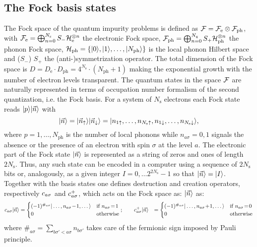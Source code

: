 \documentclass[edipack2.tex]{subfiles}
\begin{document}
\subsection{The Fock basis states}\label{sSecBasis}
The Fock space of the quantum impurity problems is defined as
${\cal F}={\cal F}_\mathrm{e}\otimes {\cal F}_\mathrm{ph}$, with ${\cal F}_\mathrm{e}=\bigoplus_{n=0}^{N_\mathrm{s}}
S_-{\cal H}_\mathrm{e}^{\otimes n}$ the electronic Fock space,  ${\cal F}_\mathrm{ph}=\bigoplus_{n=0}^{N_q}S_+{\cal H}_\mathrm{ph}^{\otimes n}$ the
phonon Fock space,  ${\cal H}_\mathrm{ph}=\{|0\rangle,|1\rangle,\dots,|N_\mathrm{ph}\rangle\}$ is the local phonon Hilbert space
and ($S_-$)  $S_+$ the (anti-)symmetrization operator.  
The total dimension of the Fock space is
$D=D_\mathrm{e}\cdot D_\mathrm{ph}=4^{N_\mathrm{s}}\cdot (N_\mathrm{ph}+1)$ making the exponential
growth with the number of electron levels transparent. 
The quantum states in the space ${\cal F}$ are naturally represented in
terms of occupation number formalism of the second quantization,
i.e. the Fock basis.
For a system of $N_\mathrm{s}$ electrons each Fock state
reads $|p\rangle|\vec{n}\rangle$ with
\begin{equation}
    |\vec{n}\rangle=|\vec{n}_\uparrow\rangle|\vec{n}_\downarrow\rangle=|n_{1\uparrow},\dots,n_{N_\mathrm{s}\uparrow},n_{1\downarrow},\dots,n_{N_\mathrm{s}\downarrow}\rangle,
    \label{eq:FockState_|nupndw>}
\end{equation}
where $p=1,\dots,N_\mathrm{ph}$ is the number of local phonons while $n_{a\sigma}=0,1$ signals the absence or the
presence of an electron with spin $\sigma$ at the level $a$.
The electronic part of the Fock state $|\vec{n}\rangle$ is represented as a string of
zeros and ones of length $2N_\mathrm{s}$. Thus, any such state can  be encoded
in a computer using a sequence of $2N_\mathrm{s}$ bits or, analogously, as a
given integer $I=0,\dots 2^{2N_\mathrm{s}}-1$ so that $|\vec{n}\rangle=|I\rangle$.  
Together with the basis states one defines  destruction and creation 
operators, respectively $c_{a\sigma}$ and $c^+_{a\sigma}$, which acts on the
Fock space as: 
$|\vec{n}\rangle$ as:  
\begin{align*}
  c_{a\sigma}\ket{\vec{n}} &=
    \begin{cases}
      (-1)^{\#_{a\sigma}}\ket{\dots,n_{a\sigma}\!-\!1,\dots}
      &\text{if $n_{a\sigma}\!=\! 1$}\\
      0 &\text{otherwise}
    \end{cases};\qquad
    c^{+}_{a\sigma}\ket{\vec{n}} &=
     \begin{cases}
      (-1)^{\#_{a\sigma}}\ket{\dots,n_{a\sigma}\!+\!1,\dots}
      & \text{if $n_{a\sigma}\!=\! 0$}\\
      0 & \text{otherwise}
    \end{cases}    
\end{align*}
where $\#_{a\sigma}=\sum_{b\sigma'<a\sigma} n_{b\sigma'}$ takes care
of the fermionic sign imposed by Pauli principle. 
\end{document}
